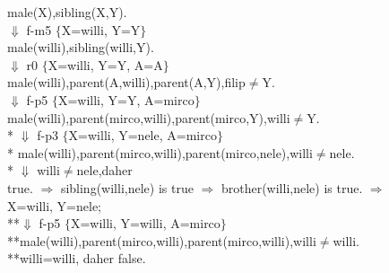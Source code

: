 \documentclass[11pt]{article}
\begin{document}
{\begin{flushleft}
male(X),sibling(X,Y).\\
 $\Downarrow$ f-m5 $\lbrace$X=willi, Y=Y$\rbrace$\\
 male(willi),sibling(willi,Y).\\
 $\Downarrow$ r0 $\lbrace$X=willi, Y=Y, A=A$\rbrace$\\
 male(willi),parent(A,willi),parent(A,Y),filip$\neq$Y. \\
 $\Downarrow$ f-p5 $\lbrace$X=willi, Y=Y, A=mirco$\rbrace$\\
 male(willi),parent(mirco,willi),parent(mirco,Y),willi$\neq$Y. \\
* $\Downarrow$ f-p3 $\lbrace$X=willi, Y=nele, A=mirco$\rbrace$\\
* male(willi),parent(mirco,willi),parent(mirco,nele),willi$\neq$nele. \\
* $\Downarrow$  willi$\neq$nele,daher \\
true. $\Rightarrow$ sibling(willi,nele)  is true $\Rightarrow$ brother(willi,nele) is true. $\Rightarrow$\\
X=willi, Y=nele;\\
**$\Downarrow$ f-p5 $\lbrace$X=willi, Y=willi, A=mirco$\rbrace$\\
**male(willi),parent(mirco,willi),parent(mirco,willi),willi$\neq$willi. \\
**willi=willi, daher false.
\end{flushleft}
 }  
\end{document}
